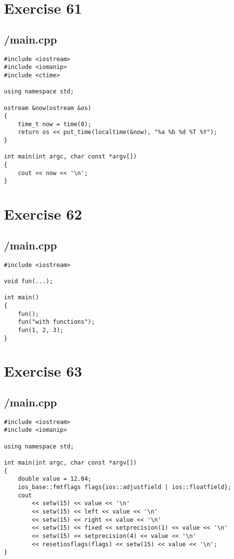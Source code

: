\documentclass{article}
\begin{document}
\section*{Exercise 61}
\subsection*{/main.cpp}
\begin{verbatim}
#include <iostream>
#include <iomanip>
#include <ctime>

using namespace std;

ostream &now(ostream &os)
{
    time_t now = time(0);
    return os << put_time(localtime(&now), "%a %b %d %T %Y");
}

int main(int argc, char const *argv[])
{
    cout << now << '\n';
}

\end{verbatim}

\section*{Exercise 62}
\subsection*{/main.cpp}
\begin{verbatim}
#include <iostream>

void fun(...);

int main()
{
    fun();
    fun("with functions");
    fun(1, 2, 3);
}
\end{verbatim}

\section*{Exercise 63}
\subsection*{/main.cpp}
\begin{verbatim}
#include <iostream>
#include <iomanip>

using namespace std;

int main(int argc, char const *argv[])
{
    double value = 12.04;
    ios_base::fmtflags flags{ios::adjustfield | ios::floatfield}; 
    cout 
        << setw(15) << value << '\n'
        << setw(15) << left << value << '\n'
        << setw(15) << right << value << '\n'
        << setw(15) << fixed << setprecision(1) << value << '\n'
        << setw(15) << setprecision(4) << value << '\n'
        << resetiosflags(flags) << setw(15) << value << '\n';
}

\end{verbatim}
\end{document}
